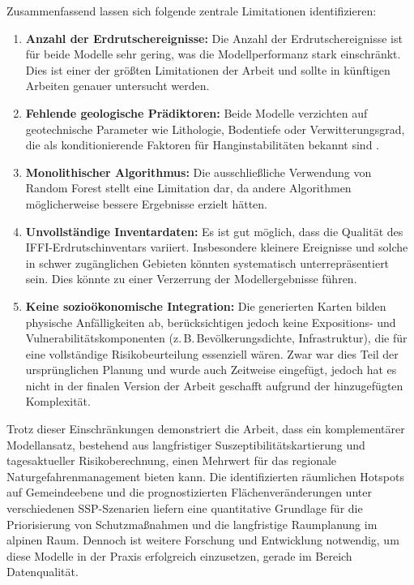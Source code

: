 \documentclass[../main.tex]{subfiles}
\begin{document}
Zusammenfassend lassen sich folgende zentrale Limitationen identifizieren:
\begin{enumerate}
    \item \textbf{Anzahl der Erdrutschereignisse:} Die Anzahl der Erdrutschereignisse ist für beide Modelle sehr gering, was die Modellperformanz stark einschränkt. Dies ist einer der größten Limitationen der Arbeit und sollte in künftigen Arbeiten genauer untersucht werden. 
    \item \textbf{Fehlende geologische Prädiktoren:} Beide Modelle verzichten auf geotechnische Parameter wie Lithologie, Bodentiefe oder Verwitterungsgrad, die als konditionierende Faktoren für Hanginstabilitäten bekannt sind \autocite{reichenbachReviewStatisticallybasedLandslide2018}.
    \item \textbf{Monolithischer Algorithmus:} Die ausschließliche Verwendung von Random Forest stellt eine Limitation dar, da andere Algorithmen möglicherweise bessere Ergebnisse erzielt hätten.
    \item \textbf{Unvollständige Inventardaten:} Es ist gut möglich, dass die Qualität des IFFI-Erdrutschinventars variiert. Insbesondere kleinere Ereignisse und solche in schwer zugänglichen Gebieten könnten systematisch unterrepräsentiert sein. Dies könnte zu einer Verzerrung der Modellergebnisse führen.
    \item \textbf{Keine sozioökonomische Integration:} Die generierten Karten bilden physische Anfälligkeiten ab, berücksichtigen jedoch keine Expositions- und Vulnerabilitätskomponenten (z.\,B.\,Bevölkerungsdichte, Infrastruktur), die für eine vollständige Risikobeurteilung essenziell wären. Zwar war dies Teil der ursprünglichen Planung und wurde auch Zeitweise eingefügt, jedoch hat es nicht in der finalen Version der Arbeit geschafft aufgrund der hinzugefügten Komplexität.
\end{enumerate}

Trotz dieser Einschränkungen demonstriert die Arbeit, dass ein komplementärer Modellansatz, bestehend aus langfristiger Suszeptibilitätskartierung und tagesaktueller Risikoberechnung, einen Mehrwert für das regionale Naturgefahrenmanagement bieten kann. 
Die identifizierten räumlichen Hotspots auf Gemeindeebene und die prognostizierten Flächenveränderungen unter verschiedenen SSP-Szenarien liefern eine quantitative Grundlage für die Priorisierung von Schutzmaßnahmen und die langfristige Raumplanung im alpinen Raum.
Dennoch ist weitere Forschung und Entwicklung notwendig, um diese Modelle in der Praxis erfolgreich einzusetzen, gerade im Bereich Datenqualität.
\end{document}
